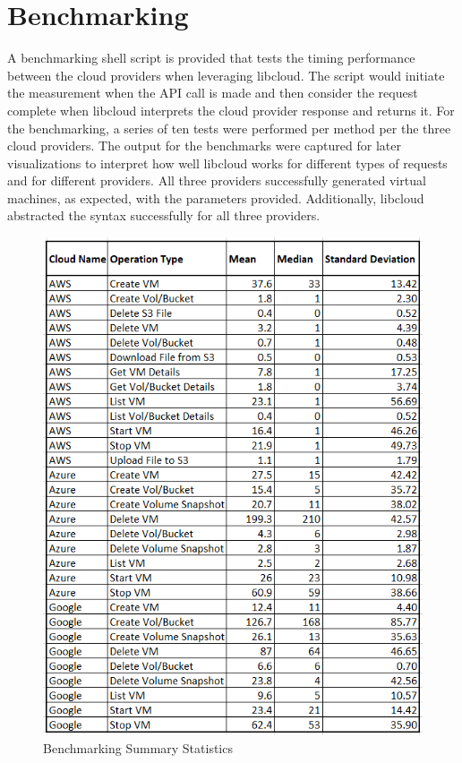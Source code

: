 \section{Benchmarking}

A benchmarking shell script is provided that tests the timing performance
between the cloud providers when leveraging libcloud. The script would initiate
the measurement when the API call is made and then consider the request
complete when libcloud interprets the cloud provider response and returns it.
For the benchmarking, a series of ten tests were performed per method per the
three cloud providers. The output for the benchmarks were captured for later
visualizations to interpret how well libcloud works for different types of
requests and for different providers. All three providers successfully
generated virtual machines, as expected, with the parameters provided.
Additionally, libcloud abstracted the syntax successfully for all three
providers. 

\begin{figure}[!ht]
  \centering
  \includegraphics[width=\columnwidth]{images/BenchmarkingSummaryStats.png}
  \caption{Benchmarking Summary Statistics}\label{F:bench-summ}
\end{figure}

